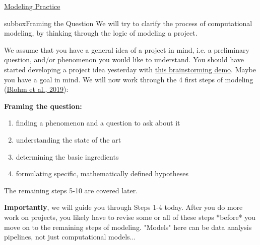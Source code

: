 \clearpage
\begin{textbox}{\href{https://compneuro.neuromatch.io/projects/modelingsteps/ModelingSteps_5through10.html}{Modeling Practice } }
\begin{subbox}{subbox}{Framing the Question}
\scriptsize
We will try to clarify the process of computational modeling, by thinking through the logic of modeling a project.

We assume that you have a general idea of a project in mind, i.e. a preliminary question, and/or phenomenon you would like to understand. You should have started developing a project idea yesterday with \href{https://youtu.be/H6rSlZzlrgQ}{this brainstorming demo}. Maybe you have a goal in mind. We will now work through the 4 first steps of modeling (\href{https://doi.org/10.1523/ENEURO.0352-19.2019}{Blohm et al., 2019}): 

\textbf{Framing the question:}\\
\begin{enumerate}    \item 
 finding a phenomenon and a question to ask about it
    \item 
 understanding the state of the art
    \item 
 determining the basic ingredients
    \item 
 formulating specific, mathematically defined hypotheses
\end{enumerate}

The remaining steps 5-10 are covered later.

\textbf{Importantly}, we will guide you through Steps 1-4 today. After you do more work on projects, you likely have to revise some or all of these steps *before* you move on to the remaining steps of modeling.  "Models" here can be data analysis pipelines, not just computational models...

\end{subbox}
\end{textbox}
